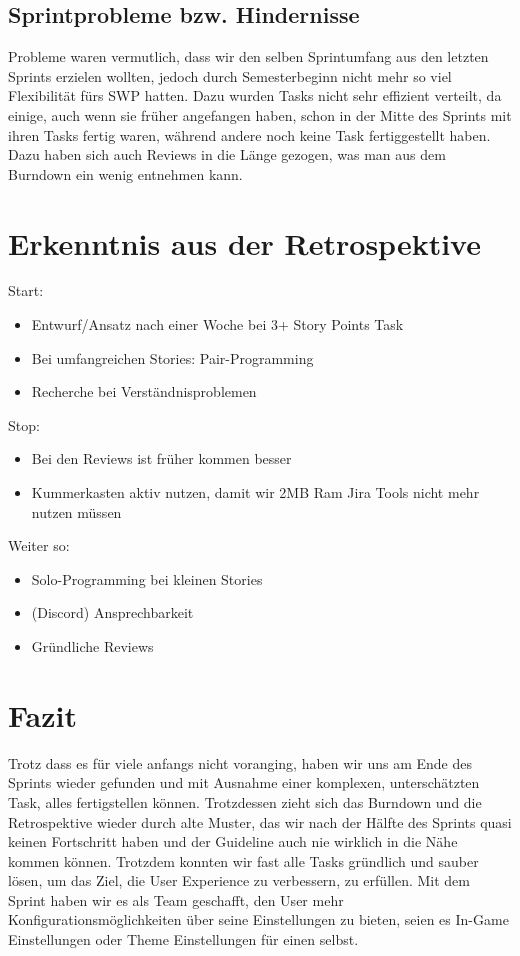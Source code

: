 \documentclass[12pt,a4paper, oneside]{article}
\begin{document}
\subsection{Sprintprobleme bzw. Hindernisse}
Probleme waren vermutlich, dass wir den selben Sprintumfang aus den letzten Sprints erzielen wollten, jedoch durch Semesterbeginn nicht mehr so viel Flexibilität fürs SWP hatten. Dazu wurden Tasks nicht sehr effizient verteilt, da einige, auch wenn sie früher angefangen haben, schon in der Mitte des Sprints mit ihren Tasks fertig waren, während andere noch keine Task fertiggestellt haben. Dazu haben sich auch Reviews in die Länge gezogen, was man aus dem Burndown ein wenig entnehmen kann.

\section{Erkenntnis aus der Retrospektive}
Start:
\begin{itemize}
\item Entwurf/Ansatz nach einer Woche bei 3+ Story Points Task
\item Bei umfangreichen Stories: Pair-Programming
\item Recherche bei Verständnisproblemen
\end{itemize}
Stop:
\begin{itemize}
\item Bei den Reviews ist früher kommen besser
\item Kummerkasten aktiv nutzen, damit wir 2MB Ram Jira Tools nicht mehr nutzen müssen
\end{itemize}
Weiter so:
\begin{itemize}
\item Solo-Programming bei kleinen Stories
\item (Discord) Ansprechbarkeit
\item Gründliche Reviews
\end{itemize}

\section{Fazit}
Trotz dass es für viele anfangs nicht voranging, haben wir uns am Ende des Sprints wieder gefunden und mit Ausnahme einer komplexen, unterschätzten Task, alles fertigstellen können. Trotzdessen zieht sich das Burndown und die Retrospektive wieder durch alte Muster, das wir nach der Hälfte des Sprints quasi keinen Fortschritt haben und der Guideline auch nie wirklich in die Nähe kommen können. Trotzdem konnten wir fast alle Tasks gründlich und sauber lösen, um das Ziel, die User Experience zu verbessern, zu erfüllen. Mit dem Sprint haben wir es als Team geschafft, den User mehr Konfigurationsmöglichkeiten über seine Einstellungen zu bieten, seien es In-Game Einstellungen oder Theme Einstellungen für einen selbst.
\end{document}
